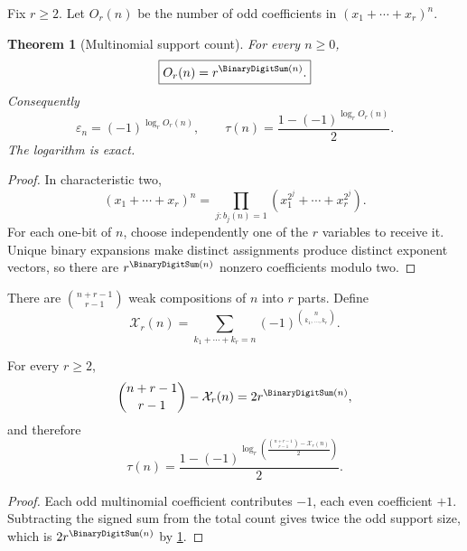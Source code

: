 \documentclass[11pt,oneside]{article}
\numberwithin{equation}{section}
\newtheorem{theorem}{Theorem}[section]
\theoremstyle{definition}
\theoremstyle{remark}
\newcommand{\eps}{\varepsilon}
\begin{document}
Fix \(r\ge2\).  Let \(O_r(n)\) be the number of odd coefficients in
\((x_1+\cdots+x_r)^n\).

\begin{theorem}[Multinomial support count]
\label{p1:thm:multinomial-support}
For every \(n\ge0\),
\begin{equation}
  \boxed{O_r(n)=r^{\BinaryDigitSum(n)}.}
  \label{p1:eq:multinomial-support}
\end{equation}
Consequently
\begin{equation}
  \boxed{
  \eps_n=(-1)^{\log_rO_r(n)},
  \qquad
  \tau(n)=\frac{1-(-1)^{\log_rO_r(n)}}2.}
  \label{p1:eq:multinomial-log}
\end{equation}
The logarithm is exact.
\end{theorem}

\begin{proof}
In characteristic two,
\begin{equation}
 (x_1+\cdots+x_r)^n
 =\prod_{j:b_j(n)=1}
   (x_1^{2^j}+\cdots+x_r^{2^j}).
  \label{p1:eq:multinomial-frobenius}
\end{equation}
For each one-bit of \(n\), choose independently one of the \(r\) variables to
receive it.  Unique binary expansions make distinct assignments produce
distinct exponent vectors, so there are \(r^{\BinaryDigitSum(n)}\) nonzero coefficients
modulo two.
\end{proof}

There are \(\binom{n+r-1}{r-1}\) weak compositions of \(n\) into \(r\) parts.
Define
\begin{equation}
  \mathcal X_r(n)=
  \sum_{k_1+\cdots+k_r=n}
  (-1)^{\binom{n}{k_1,\ldots,k_r}}.
  \label{p1:eq:Xr-definition}
\end{equation}

\begin{corollary}
\label{p1:cor:rnomial-log}
For every \(r\ge2\),
\begin{equation}
  \binom{n+r-1}{r-1}-\mathcal X_r(n)
   =2r^{\BinaryDigitSum(n)},
  \label{p1:eq:rnomial-exact}
\end{equation}
and therefore
\begin{equation}
  \boxed{
  \tau(n)=\frac{1-(-1)^{\displaystyle
    \log_r\!\left(
      \frac{\binom{n+r-1}{r-1}-\mathcal X_r(n)}2
    \right)}}2.}
  \label{p1:eq:rnomial-log-formula}
\end{equation}
\end{corollary}

\begin{proof}
Each odd multinomial coefficient contributes \(-1\), each even coefficient
\(+1\).  Subtracting the signed sum from the total count gives twice the odd
support size, which is \(2r^{\BinaryDigitSum(n)}\) by
\cref{p1:thm:multinomial-support}.
\end{proof}
\end{document}
